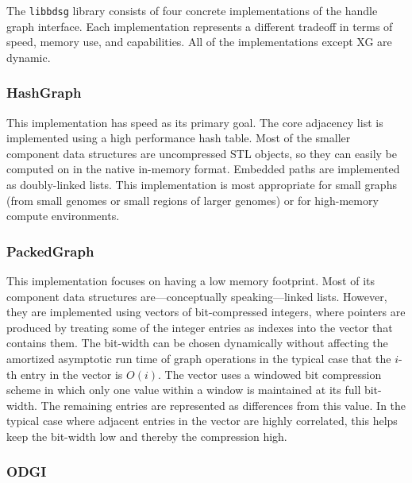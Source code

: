 \documentclass{article}
\begin{document}
The \texttt{libbdsg} library consists of four concrete implementations of the handle graph interface.
Each implementation represents a different tradeoff in terms of speed, memory use, and capabilities.
All of the implementations except XG are dynamic. 

\subsubsection{HashGraph}

This implementation has speed as its primary goal.
The core adjacency list is implemented using a high performance hash table.
Most of the smaller component data structures are uncompressed STL objects, so they can easily be computed on in the native in-memory format.
Embedded paths are implemented as doubly-linked lists.
This implementation is most appropriate for small graphs (from small genomes or small regions of larger genomes) or for high-memory compute environments.

\subsubsection{PackedGraph}

This implementation focuses on having a low memory footprint.
Most of its component data structures are---conceptually speaking---linked lists.
However, they are implemented using vectors of bit-compressed integers, where pointers are produced by treating some of the integer entries as indexes into the vector that contains them.
The bit-width can be chosen dynamically without affecting the amortized asymptotic run time of graph operations in the typical case that the $i$-th entry in the vector is $O(i)$.
The vector uses a windowed bit compression scheme in which only one value within a window is maintained at its full bit-width.
The remaining entries are represented as differences from this value.
In the typical case where adjacent entries in the vector are highly correlated, this helps keep the bit-width low and thereby the compression high. 

\subsubsection{ODGI}
\end{document}
